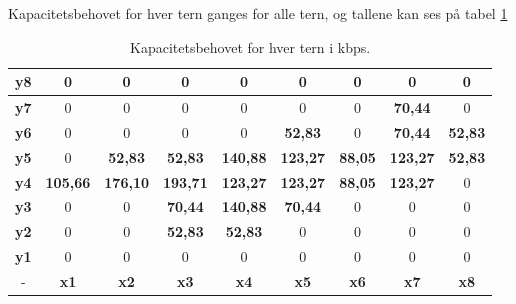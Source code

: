 Kapacitetsbehovet for hver tern ganges for alle tern, og tallene kan ses på tabel \ref{tab:kapBehovTern}
\begin{table}[h]\label{tab:kapBehovTern}
	\centering
    \begin{tabular}{|c|c|c|c|c|c|c|c|c|}
    \hline
    \textbf{y8} & 0      & 0      & 0      & 0      & 0      & 0     & 0      & 0     \\ \hline
    \textbf{y7} & 0      & 0      & 0      & 0      & 0      & 0     & \textbf{70,44}  & 0     \\ \hline
    \textbf{y6} & 0      & 0      & 0      & 0      & \textbf{52,83}  & 0     & \textbf{70,44}  & \textbf{52,83} \\ \hline
    \textbf{y5} & 0      & \textbf{52,83}  & \textbf{52,83}  & \textbf{140,88} & \textbf{123,27} & \textbf{88,05} & \textbf{123,27} & \textbf{52,83} \\ \hline
    \textbf{y4} & \textbf{105,66} & \textbf{176,10} & \textbf{193,71} & \textbf{123,27} & \textbf{123,27} & \textbf{88,05} & \textbf{123,27} & 0     \\ \hline
    \textbf{y3} & 0      & 0      & \textbf{70,44}  & \textbf{140,88} & \textbf{70,44}  & 0     & 0      & 0     \\ \hline
    \textbf{y2} & 0      & 0      & \textbf{52,83}  & \textbf{52,83}  & 0      & 0     & 0      & 0     \\ \hline
    \textbf{y1} & 0      & 0      & 0      & 0      & 0      & 0     & 0      & 0     \\ \hline
    -  & \textbf{x1}     & \textbf{x2}     & \textbf{x3}     & \textbf{x4}     & \textbf{x5}     & \textbf{x6}    & \textbf{x7}     & \textbf{x8}    \\ \hline
    \end{tabular}
    \caption{Kapacitetsbehovet for hver tern i kbps.}
\end{table}